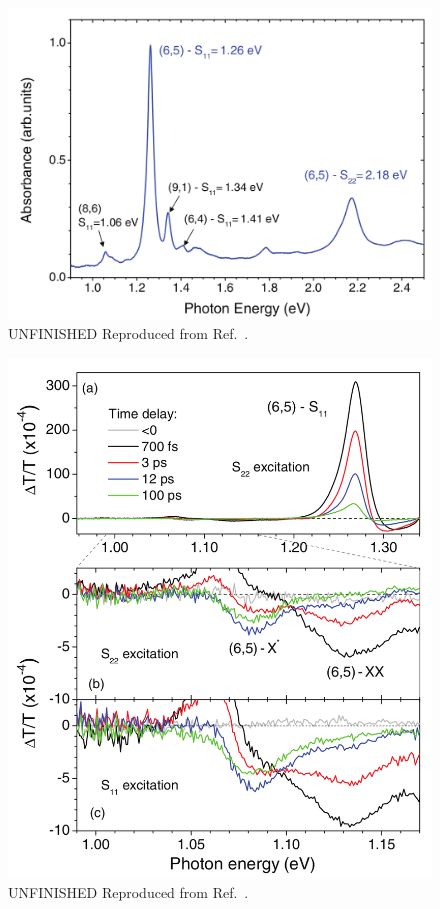\begin{figure}[ht]
	\centering
	\includegraphics[scale=0.3]{images/chapter_prior_works/abs_yuma}
	\caption{{\color{red} UNFINISHED} Reproduced from Ref.\ \cite{yuma2013biexciton}.}
\end{figure}

\begin{figure}[ht]
	\centering
	\includegraphics[scale=0.3]{images/chapter_prior_works/dtt_yuma}
	\caption{{\color{red} UNFINISHED} Reproduced from Ref.\ \cite{yuma2013biexciton}.}
\end{figure}

